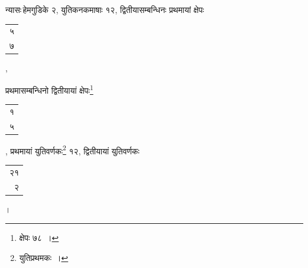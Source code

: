 \documentclass[10pt, openany]{book}
\begin{document}
{{\newpage

{न्यासः\textendash \,हेमगुडिके २, युतिकनकमाषाः १२, द्वितीयासम्बन्धिनः प्रथमायां
क्षेपः\begin{tabular}{r}५\\ ७\end{tabular},}
{प्रथमासम्बन्धिनो द्वितीयायां क्षेपः\renewcommand{\thefootnote}{\s १}\footnote{\s क्षेपः ७८~।}\begin{tabular}{r}१ \\५\end{tabular}, प्रथमायां युतिवर्णकः\renewcommand{\thefootnote}{\s २}\footnote{\s युतिप्रथमकः~।} १२, द्वितीयायां युतिवर्णकः\begin{tabular}{r}२१\\ २\end{tabular}।}
\vspace{-1mm}

}}
\end{document}
